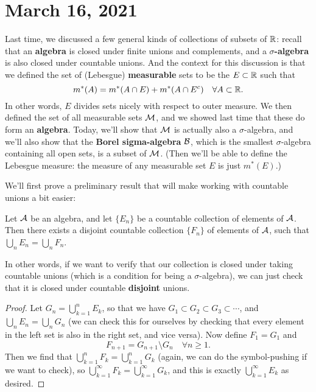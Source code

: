 \pagebreak\section{March 16, 2021}

Last time, we discussed a few general kinds of collections of subsets of $\mathbb R$: recall that an \textbf{algebra} is closed under finite unions and complements, and a \textbf{$\sigma$-algebra} is also closed under countable unions. And the context for this discussion is that we defined the set of (Lebesgue) \textbf{measurable} sets to be the $E \subset \mathbb R$ such that
\[
    m^\ast(A) = m^\ast(A \cap E) + m^\ast(A \cap E^c) \quad \forall A \subset \mathbb R.
\]
In other words, $E$ divides sets nicely with respect to outer measure. We then defined the set of all measurable sets $\mathcal{M}$, and we showed last time that these do form an \textbf{algebra}. Today, we'll show that $\mathcal{M}$ is actually also a $\sigma$-algebra, and we'll also show that the \textbf{Borel sigma-algebra} $\mathcal{B}$, which is the smallest $\sigma$-algebra containing all open sets, is a subset of $\mathcal{M}$. (Then we'll be able to define the Lebesgue measure: the measure of any measurable set $E$ is just $m^\ast(E)$.)

We'll first prove a preliminary result that will make working with countable unions a bit easier: 

\begin{lemma}\label{countabledisjoint}
Let $\mathcal{A}$ be an algebra, and let $\{E_n\}$ be a countable collection of elements of $\mathcal{A}$. Then there exists a disjoint countable collection $\{F_n\}$ of elements of $\mathcal{A}$, such that $\bigcup_n E_n = \bigcup_n F_n$. 
\end{lemma}

In other words, if we want to verify that our collection is closed under taking countable unions (which is a condition for being a $\sigma$-algebra), we can just check that it is closed under countable \textbf{disjoint} unions.

\begin{proof}
Let $G_n = \bigcup_{k=1}^n E_k$, so that we have $G_1 \subset G_2 \subset G_3 \subset \cdots$, and $\bigcup_n E_n = \bigcup_n G_n$ (we can check this for ourselves by checking that every element in the left set is also in the right set, and vice versa). Now define $F_1 = G_1$ and
\[
    F_{n+1} = G_{n+1} \setminus G_n \quad \forall n \ge 1.
\]
Then we find that $\bigcup_{k=1}^n F_k = \bigcup_{k=1}^n G_k$ (again, we can do the symbol-pushing if we want to check), so $\bigcup_{k=1}^{\infty} F_k = \bigcup_{k=1}^{\infty} G_k$, and this is exactly $\bigcup_{k=1}^{\infty} E_k$ as desired.
\end{proof}

